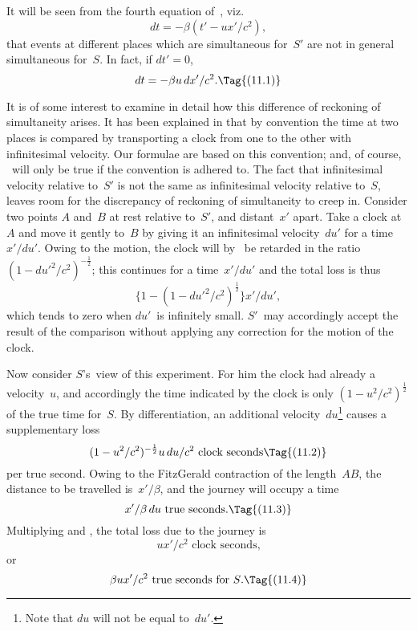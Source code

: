 \documentclass[12pt]{book}
\begin{document}
%

It will be seen from the fourth equation of~, viz.\
\[
dt = -\beta (t' - ux'/c^{2}),
\]
that events at different places which are simultaneous for~$S'$ are not in general
simultaneous for~$S$. In fact, if $dt' = 0$,
\[
dt = -\beta u\, dx'/c^{2}.
\Tag{(11.1)}
\]

It is of some interest to examine in detail how this difference of reckoning
of simultaneity arises. It has been explained in \SecRef{4} that by convention the
time at two places is compared by transporting a clock from one to the other
\index{Clocks, transport of}%
%
with infinitesimal velocity. Our formulae are based on this convention; and,
of course, \Eq{(11.1)}~will only be true if the convention is adhered to. The fact
that infinitesimal velocity relative to~$S'$ is not the same as infinitesimal
velocity relative to~$S$, leaves room for the discrepancy of reckoning of simultaneity
to creep in. Consider two points $A$ and~$B$ at rest relative to~$S'$, and
distant~$x'$ apart. Take a clock at~$A$ and move it gently to~$B$ by giving it an
\PageSep{28}
%
infinitesimal velocity~$du'$ for a time~$x'/du'$. Owing to the motion, the clock
will by~\Eq{(4.9)} be retarded in the ratio $(1 - du'^{2}/c^{2})^{-\frac{1}{2}}$; this continues for a time~$x'/du'$
and the total loss is thus
\[
\bigl\{1 - (1 - du'^{2}/c^{2})^{\frac{1}{2}}\bigr\} x'/du',
\]
which tends to zero when $du'$~is infinitely small. $S'$~may accordingly accept
the result of the comparison without applying any correction for the motion
of the clock.

Now consider $S$'s~view of this experiment. For him the clock had already
a velocity~$u$, and accordingly the time indicated by the clock is only $(1 - u^{2}/c^{2})^{\frac{1}{2}}$
of the true time for~$S$. By differentiation, an additional velocity~$du$\footnote
  {Note that $du$ will not be equal to~$du'$.}
causes
a supplementary loss
\[
(1 - u^{2}/c^{2})^{-\frac{1}{2}} u\, du/c^{2} \text{ clock seconds}
\Tag{(11.2)}
\]
per true second. Owing to the FitzGerald contraction of the length~$AB$, the
distance to be travelled is~$x'/\beta$, and the journey will occupy a time
\[
x'/\beta\, du \text{ true seconds}.
\Tag{(11.3)}
\]
Multiplying  and , the total loss due to the journey is
\[
ux'/c^{2} \text{ clock seconds,}
\]
or
\[
\beta ux'/c^{2} \text{ true seconds for~$S$.}
\Tag{(11.4)}
\]
\end{document}
